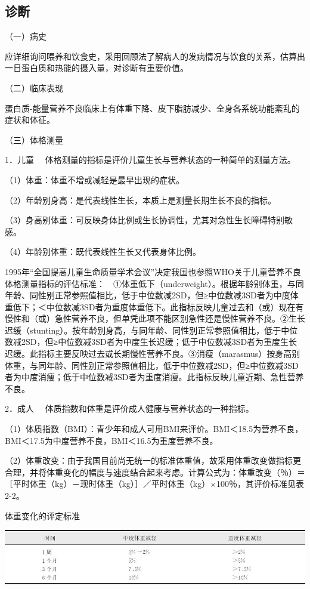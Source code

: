 \hypertarget{text00003.htmlux5cux23mllj13}{%
\subsection{诊断}\label{text00003.htmlux5cux23mllj13}}

（一）病史

应详细询问喂养和饮食史，采用回顾法了解病人的发病情况与饮食的关系，估算出一日蛋白质和热能的摄入量，对诊断有重要价值。

（二）临床表现

蛋白质-能量营养不良临床上有体重下降、皮下脂肪减少、全身各系统功能紊乱的症状和体征。

（三）体格测量

{1．儿童} 　体格测量的指标是评价儿童生长与营养状态的一种简单的测量方法。

（1）体重：体重不增或减轻是最早出现的症状。

（2）年龄别身高：是代表线性生长，本质上是测量长期生长不良的指标。

（3）身高别体重：可反映身体比例或生长协调性，尤其对急性生长障碍特别敏感。

（4）年龄别体重：既代表线性生长又代表身体比例。

1995年“全国提高儿童生命质量学术会议”决定我国也参照WHO关于儿童营养不良体格测量指标的评估标准：　①体重低下（underweight）。根据年龄别体重，与同年龄、同性别正常参照值相比，低于中位数减2SD，但≥中位数减3SD者为中度体重低下；＜中位数减3SD者为重度体重低下。此指标反映儿童过去和（或）现在有慢性和（或）急性营养不良，但单凭此项不能区别急性还是慢性营养不良。②生长迟缓（stunting）。按年龄别身高，与同年龄、同性别正常参照值相比，低于中位数减2SD，但≥中位数减3SD者为中度生长迟缓；低于中位数减3SD者为重度生长迟缓。此指标主要反映过去或长期慢性营养不良。③消瘦（marasmus）按身高别体重，与同年龄、同性别正常参照值相比，低于中位数减2SD，但≥中位数减3SD者为中度消瘦；低于中位数减3SD者为重度消瘦。此指标反映儿童近期、急性营养不良。

{2．成人} 　体质指数和体重是评价成人健康与营养状态的一种指标。

（1）体质指数（BMI）：青少年和成人可用BMI来评价。BMI＜18.5为营养不良，BMI＜17.5为中度营养不良，BMI＜16.5为重度营养不良。

（2）体重改变：由于我国目前尚无统一的标准体重值，故采用体重改变做指标更合理，并将体重变化的幅度与速度结合起来考虑。计算公式为：体重改变（％）＝［平时体重（kg）－现时体重（kg）］／平时体重（kg）×100％，其评价标准见表2-2。

\begin{table}[htbp]
\centering
\caption{体重变化的评定标准}
\label{tab2-2}
\includegraphics{./images/Image00007.jpg}
\end{table}


